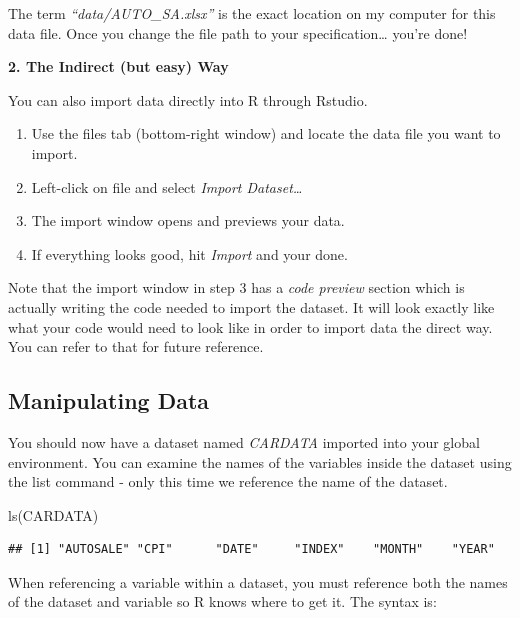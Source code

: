 \documentclass[
]{book}
\newenvironment{Shaded}{\begin{snugshade}}{\end{snugshade}}
\newcommand{\FunctionTok}[1]{\textcolor[rgb]{0.00,0.00,0.00}{#1}}
\newcommand{\NormalTok}[1]{#1}
\begin{document}
The term \emph{``data/AUTO\_SA.xlsx''} is the exact location on my computer for this data file. Once you change the file path to your specification\ldots{} you're done!

\textbf{2. The Indirect (but easy) Way}

You can also import data directly into R through Rstudio.

\begin{enumerate}
\def\labelenumi{\arabic{enumi}.}
\item
  Use the files tab (bottom-right window) and locate the data file you want to import.
\item
  Left-click on file and select \emph{Import Dataset\ldots{}}
\item
  The import window opens and previews your data.
\item
  If everything looks good, hit \emph{Import} and your done.
\end{enumerate}

Note that the import window in step 3 has a \emph{code preview} section which is actually writing the code needed to import the dataset. It will look exactly like what your code would need to look like in order to import data the direct way. You can refer to that for future reference.

\hypertarget{manipulating-data}{%
\subsection{Manipulating Data}\label{manipulating-data}}

You should now have a dataset named \emph{CARDATA} imported into your global environment. You can examine the names of the variables inside the dataset using the list command - only this time we reference the name of the dataset.

\begin{Shaded}
\begin{Highlighting}[]
\FunctionTok{ls}\NormalTok{(CARDATA)}
\end{Highlighting}
\end{Shaded}

\begin{verbatim}
## [1] "AUTOSALE" "CPI"      "DATE"     "INDEX"    "MONTH"    "YEAR"
\end{verbatim}

When referencing a variable within a dataset, you must reference both the names of the dataset and variable so R knows where to get it. The syntax is:
\end{document}
